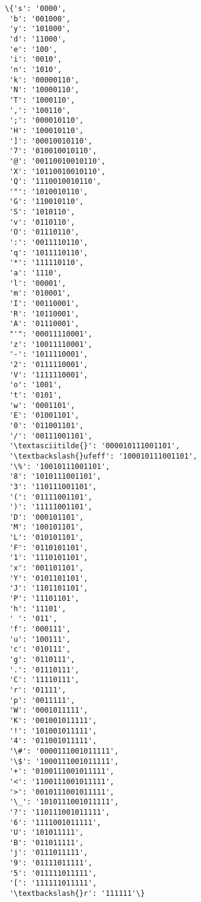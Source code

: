 \documentclass[11pt]{article}
\makeatletter
\newcommand{\boxspacing}{\kern\kvtcb@left@rule\kern\kvtcb@boxsep}
\newcommand{\prompt}[4]{
        \ttfamily\llap{{\color{#2}[#3]:\hspace{3pt}#4}}\vspace{-\baselineskip}
    }
\makeatother
\begin{document}
            \begin{tcolorbox}[breakable, size=fbox, boxrule=.5pt, pad at break*=1mm, opacityfill=0]
\prompt{Out}{outcolor}{23}{\boxspacing}
\begin{Verbatim}[commandchars=\\\{\}]
\{'s': '0000',
 'b': '001000',
 'y': '101000',
 'd': '11000',
 'e': '100',
 'i': '0010',
 'n': '1010',
 'k': '00000110',
 'N': '10000110',
 'T': '1000110',
 ',': '100110',
 ';': '000010110',
 'H': '100010110',
 ']': '00010010110',
 '7': '010010010110',
 '@': '00110010010110',
 'X': '10110010010110',
 'Q': '1110010010110',
 '"': '1010010110',
 'G': '110010110',
 'S': '1010110',
 'v': '0110110',
 'O': '01110110',
 ':': '0011110110',
 'q': '1011110110',
 '*': '111110110',
 'a': '1110',
 'l': '00001',
 'm': '010001',
 'I': '00110001',
 'R': '10110001',
 'A': '01110001',
 "'": '00011110001',
 'z': '10011110001',
 '-': '1011110001',
 '2': '0111110001',
 'V': '1111110001',
 'o': '1001',
 't': '0101',
 'w': '0001101',
 'E': '01001101',
 '0': '011001101',
 '/': '00111001101',
 '\textasciitilde{}': '000010111001101',
 '\textbackslash{}ufeff': '100010111001101',
 '\%': '10010111001101',
 '8': '1010111001101',
 '3': '110111001101',
 '(': '01111001101',
 ')': '11111001101',
 'D': '000101101',
 'M': '100101101',
 'L': '010101101',
 'F': '0110101101',
 '1': '1110101101',
 'x': '001101101',
 'Y': '0101101101',
 'J': '1101101101',
 'P': '11101101',
 'h': '11101',
 ' ': '011',
 'f': '000111',
 'u': '100111',
 'c': '010111',
 'g': '0110111',
 '.': '01110111',
 'C': '11110111',
 'r': '01111',
 'p': '0011111',
 'W': '0001011111',
 'K': '001001011111',
 '!': '101001011111',
 '4': '011001011111',
 '\#': '0000111001011111',
 '\$': '1000111001011111',
 '+': '0100111001011111',
 '<': '1100111001011111',
 '>': '0010111001011111',
 '\_': '1010111001011111',
 '?': '110111001011111',
 '6': '1111001011111',
 'U': '101011111',
 'B': '011011111',
 'j': '0111011111',
 '9': '01111011111',
 '5': '011111011111',
 '[': '111111011111',
 '\textbackslash{}r': '111111'\}
\end{Verbatim}
\end{tcolorbox}
        
\end{document}
